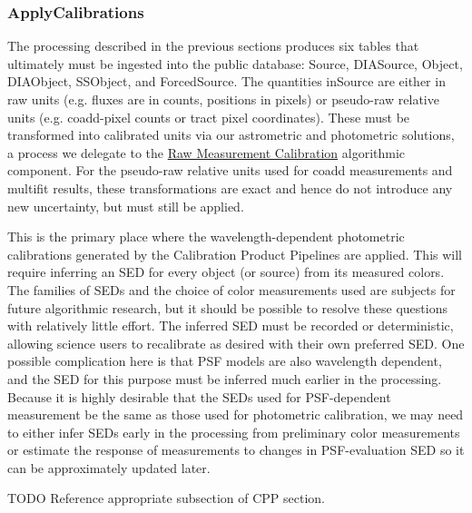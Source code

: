 \subsubsection{ApplyCalibrations}
\label{sec:drpApplyCalibrations}

The processing described in the previous sections produces six tables that ultimately must be ingested into the public database: Source, DIASource, Object, DIAObject, SSObject, and ForcedSource.  The quantities inSource  are either in raw units (e.g. fluxes are in counts, positions in pixels) or pseudo-raw relative units (e.g. coadd-pixel counts or tract pixel coordinates).  These must be transformed into calibrated units via our astrometric and photometric solutions, a process we delegate to the \hyperref[sec:acRawMeasurementCalibration]{Raw Measurement Calibration} algorithmic component.  For the pseudo-raw relative units used for coadd measurements and multifit results, these transformations are exact and hence do not introduce any new uncertainty, but must still be applied.

This is the primary place where the wavelength-dependent photometric calibrations generated by the Calibration Product Pipelines are applied.  This will require inferring an SED for every object (or source) from its measured colors.  The families of SEDs and the choice of color measurements used are subjects for future algorithmic research, but it should be possible to resolve these questions with relatively little effort.  The inferred SED must be recorded or deterministic, allowing science users to recalibrate as desired with their own preferred SED.  One possible complication here is that PSF models are also wavelength dependent, and the SED for this purpose must be inferred much earlier in the processing.  Because it is highly desirable that the SEDs used for PSF-dependent measurement be the same as those used for photometric calibration, we may need to either infer SEDs early in the processing from preliminary color measurements or estimate the response of measurements to changes in PSF-evaluation SED so it can be approximately updated later.

\begin{note}{TODO}
Reference appropriate subsection of CPP section.
\end{note}

